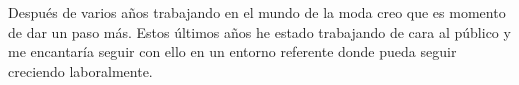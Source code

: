 

\begin{cvparagraph}

Después de varios años trabajando en el mundo de la moda creo que es momento de dar un paso más. Estos últimos años he estado trabajando de cara al público y me encantaría seguir con ello en un entorno referente donde pueda seguir creciendo laboralmente.
\end{cvparagraph}
